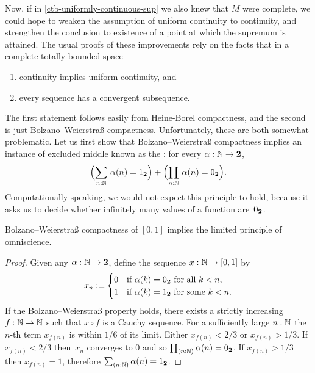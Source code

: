 Now, if in \autoref{ctb-uniformly-continuous-sup} we also knew that $M$ were complete, we
could hope to weaken the assumption of uniform continuity to continuity, and strengthen
the conclusion to existence of a point at which the supremum is attained. The usual proofs
of these improvements rely on the facts that in a complete totally bounded space
%
\begin{enumerate}
\item continuity implies uniform continuity, and
\item every sequence has a convergent subsequence.
\end{enumerate}
%
The first statement follows easily from Heine-Borel compactness, and the second is just
Bolzano--Weierstra\ss{} compactness.
%
Unfortunately, these are both somewhat problematic. Let
us first show that Bolzano--Weierstra\ss{} compactness implies an instance of excluded middle
known as the :
%
%
for every $\alpha : \mathbb{N} \to \mathbf{2}$,
% 
\begin{equation} \label{eq:lpo}
  \Parens{\sm{n : \N} \alpha(n) = \btrue} +
  \Parens{\prd{n : \N} \alpha(n) = \bfalse}.
\end{equation}
%
Computationally speaking, we would not expect this principle to hold, because it asks us to decide
whether infinitely many values of a function are~${0_{\mathbf{2}}}$.
  
\begin{thm} \label{analysis-bw-lpo}
  Bolzano--Weierstra\ss{} compactness of $[0,1]$ implies the limited principle of omniscience.
\end{thm}

\begin{proof}
  Given any $\alpha : \mathbb{N} \to \mathbf{2}$, define the sequence $x : \mathbb{N} \to [0,1]$ by
  \begin{equation*}
    x_n \vcentcolon\equiv
    \begin{cases}
      0 & \text{if $\alpha(k) = {0_{\mathbf{2}}}$ for all $k < n$,}\\
      1 & \text{if $\alpha(k) = {1_{\mathbf{2}}}$ for some $k < n$}.
    \end{cases}
  \end{equation*}
  If the Bolzano--Weierstra\ss{} property holds, there exists a strictly increasing $f : \mathbb{N} \to
  \mathbb{N}$ such that $x \circ f$ is a Cauchy sequence. For a sufficiently large $n :
  \mathbb{N}$ the $n$-th term $x_{f(n)}$ is within $1/6$ of its limit. Either $x_{f(n)} < 2/3$ or
  $x_{f(n)} > 1/3$. If $x_{f(n)} < 2/3$ then~$x_n$ converges to $0$ and so $\prd{n : \N}
  \alpha(n) = \bfalse$. If $x_{f(n)} > 1/3$ then $x_{f(n)} = 1$, therefore $\sm{n : \N}
  \alpha(n) = \btrue$.
\end{proof}

